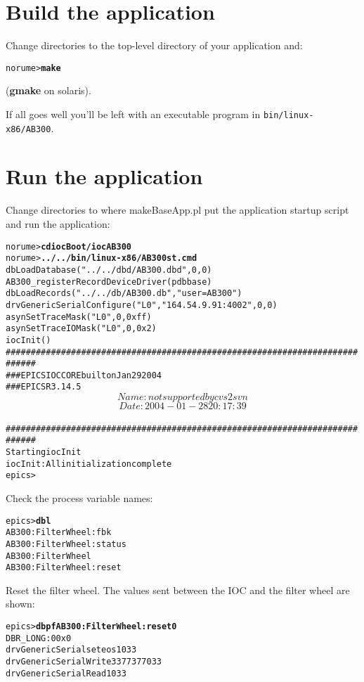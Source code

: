 \documentclass[twoside]{article}
\begin{document}
\section{Build the application}
Change directories to the top-level directory of your application and:
\begin{alltt}
norume> {\bf make}
\end{alltt}
({\bf gmake} on solaris).

If all goes well you'll be left with an executable program in
{\tt bin/linux-x86/AB300}.



\section{Run the application}
Change directories to where makeBaseApp.pl put the application startup script
and run the application:
\begin{alltt}
norume> {\bf cd iocBoot/iocAB300}
norume> {\bf ../../bin/linux-x86/AB300 st.cmd}
dbLoadDatabase("../../dbd/AB300.dbd",0,0)
AB300_registerRecordDeviceDriver(pdbbase) 
dbLoadRecords("../../db/AB300.db","user=AB300")
drvGenericSerialConfigure("L0","164.54.9.91:4002",0,0)
asynSetTraceMask("L0",0,0xff)
asynSetTraceIOMask("L0",0,0x2)
iocInit()
############################################################################
###  EPICS IOC CORE built on Jan 29 2004
###  EPICS R3.14.5 $$Name: not supported by cvs2svn $$ $$Date: 2004-01-28 20:17:39 $$
############################################################################
Starting iocInit
iocInit: All initialization complete
epics>
\end{alltt}

Check the process variable names:
\begin{alltt}
epics> {\bf dbl}
AB300:FilterWheel:fbk
AB300:FilterWheel:status
AB300:FilterWheel
AB300:FilterWheel:reset
\end{alltt}

Reset the filter wheel.  The values sent between the IOC and the filter wheel
are shown:
\begin{alltt}
epics> {\bf dbpf AB300:FilterWheel:reset 0}
DBR_LONG:           0         0x0                 
drvGenericSerial set eos 1 \verb@\@033
drvGenericSerialWrite 3 \verb@\@377\verb@\@377\verb@\@033
drvGenericSerialRead 1 \verb@\@033
\end{alltt}
\end{document}
